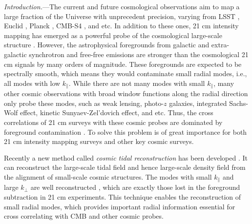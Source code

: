 \documentclass[aps,prl,twocolumn,showpacs,superscriptaddress,groupedaddress,nofootinbib,floatfix]{revtex4}  %
\begin{document}
\pacs{}
\maketitle


{\it Introduction.}---The current and future cosmological observations aim
to map a large fraction of the Universe with unprecedent precision, varying
from LSST \cite{2009:lsst}, Euclid \cite{2012:euclid}, 
Planck \cite{2015arXiv150201582P}, CMB-S4 \cite{2014ApJ...788..138W}, and etc. 
In addition to these ones, 21 cm intensity mapping has emerged as
a powerful probe of the 
cosmological large-scale structure \cite{2008:21cm,chang}.
However, the astrophysical foregrounds from galactic and extra-galactic
synchrotron and free-free emissions are stronger than the cosmological 21 cm 
signals by many orders of magnitude. These foregrounds are expected to be 
spectrally smooth, which means they would contaminate small radial
modes, i.e., all modes with low $k_\parallel$.
While there are not many modes with small $k_\parallel$, many other cosmic
observations with broad window functions along the radial direction only 
probe these modes, such as weak lensing, photo-$z$ galaxies, 
integrated Sachs-Wolf effect, kinetic Sunyaev-Zel'dovich effect, and etc.  
Thus, 
the cross correlations of 21 cm surveys with these cosmic probes are dominated 
by foreground contamination \cite{2007ApJ...660.1030F,2008MNRAS.384..291A}. 
To solve this problem is of great importance for both 21 cm 
intensity mapping surveys and other key cosmic surveys.

Recently a new method called {\it cosmic tidal reconstruction} has been 
developed \cite{2012:pen,2015:zhu}. It can reconstruct the large-scale 
tidal field and hence large-scale density field from the alignment of 
small-scale cosmic structures.
The modes with small $k_\parallel$ and large $k_\perp$ are well 
reconstructed \cite{2015:zhu}, which are exactly those lost in the foreground 
subtraction in 21 cm experiments. 
This technique enables the reconstruction of small radial modes, 
which provides important radial information essential for cross correlating 
with CMB and other cosmic probes.
\end{document}
